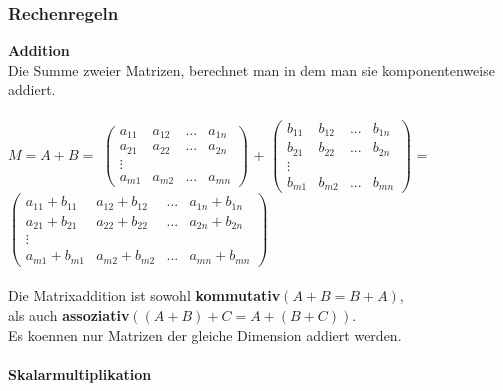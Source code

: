 \documentclass[a4paper]{article} %
\begin{document}
	\subsubsection{Rechenregeln}
	\textbf{Addition}\\
	Die Summe zweier Matrizen, berechnet man in dem man sie komponentenweise addiert.\\\\
	\small
	$M = A + B = $ 	
	$
	\begin{pmatrix}
		a_{11} & a_{12} & ... 	& a_{1n}\\
		a_{21} & a_{22} & ...	& a_{2n}\\
		\vdots &        &	    &\\
		a_{m1} & a_{m2} & ...	& a_{mn}
	\end{pmatrix}
	$
	+
	$
	\begin{pmatrix}
	b_{11} & b_{12} & ... 	& b_{1n}\\
	b_{21} & b_{22} & ...	& b_{2n}\\
	\vdots &        &	    &\\
	b_{m1} & b_{m2} & ...	& b_{mn}
	\end{pmatrix}
	$
	=
	$
	\begin{pmatrix}
	a_{11}+b_{11} & a_{12}+b_{12} & ...    & a_{1n}+b_{1n}\\
	a_{21}+b_{21} & a_{22}+b_{22}  & ...	   & a_{2n}+ b_{2n}\\
	\vdots        &               &	       &\\
	a_{m1}+b_{m1} & a_{m2}+b_{m2} & ...	   & a_{mn}+ b_{mn}
	\end{pmatrix}
	$\\
	\\
	Die Matrixaddition ist sowohl \textbf{kommutativ}$(A+B=B+A)$,\\ als auch \textbf{assoziativ}$( (A+B)+C = A +(B+C))$.\\
	Es koennen nur Matrizen der gleiche Dimension addiert werden.\\\\
	\textbf{Skalarmultiplikation}\\
	
\end{document}
